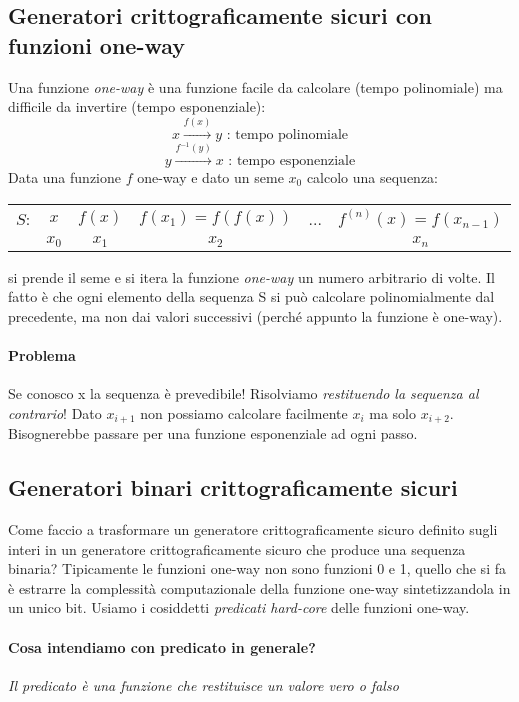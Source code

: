 \subsection{Generatori crittograficamente sicuri con funzioni one-way}
Una funzione \emph{one-way} è una funzione facile da calcolare (tempo polinomiale) ma difficile da invertire (tempo esponenziale):
$$ x \xrightarrow{f(x)} y \text{ : tempo polinomiale} $$
$$ y \xrightarrow{f^{-1}(y)} x \text{ : tempo esponenziale} $$
Data una funzione $f$ one-way e dato un seme $x_{0}$ calcolo una sequenza:
\begin{center}
    \begin{tabular}{c | c c c c c}
        $S$: & $x$ & $f(x)$ & $f(x_{1}) = f(f(x))$ & ... & $f^{(n)}(x) = f(x_{n-1})$ \\
         & $x_{0}$ & $x_{1}$ & $x_{2}$ & & $x_{n}$ \\
    \end{tabular}
\end{center}
si prende il seme e si itera la funzione \textit{one-way} un numero arbitrario di volte. Il fatto è che ogni elemento della sequenza S si può calcolare polinomialmente dal precedente, ma non dai valori successivi (perché appunto la funzione è one-way). 
\paragraph{Problema} Se conosco x la sequenza è prevedibile! Risolviamo \emph{restituendo la sequenza al contrario}! Dato $x_{i+1}$ non possiamo calcolare facilmente $x_{i}$ ma solo $x_{i+2}$. Bisognerebbe passare per una funzione esponenziale ad ogni passo.

\subsection{Generatori binari crittograficamente sicuri}
Come faccio a trasformare un generatore crittograficamente sicuro definito sugli interi in un generatore crittograficamente sicuro che produce una sequenza binaria? Tipicamente le funzioni one-way non sono funzioni 0 e 1, quello che si fa è estrarre la complessità computazionale della funzione one-way sintetizzandola in un unico bit. Usiamo i cosiddetti \textit{predicati hard-core} delle funzioni one-way. 
\paragraph{Cosa intendiamo con predicato in generale?} \emph{Il predicato è una funzione che restituisce un valore vero o falso}
